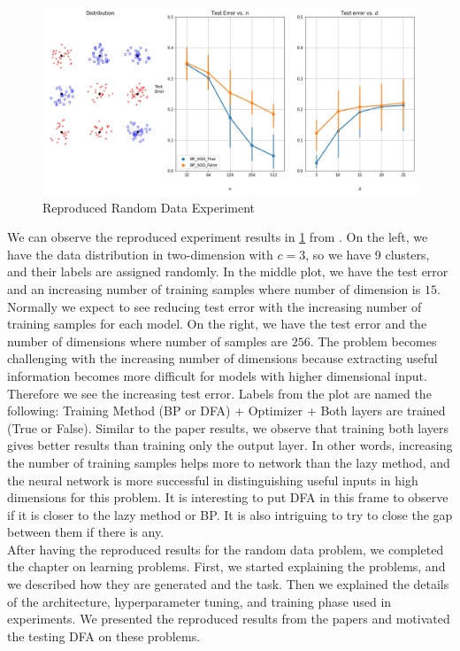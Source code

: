 \documentclass[a4paper, nobind]{templates/ociamthesis}
\begin{document}
\begin{figure}

{\centering \includegraphics[width=1\linewidth]{figures/2_randomData_reproduced} 

}

\caption{Reproduced Random Data Experiment \cite{chizat2020implicit}}\label{fig:randomData}
\end{figure}

\noindent We can observe the reproduced experiment results in \ref{fig:randomData} from \cite{chizat2020implicit}. On the left, we have the data distribution in two-dimension with \(c=3\), so we have 9 clusters, and their labels are assigned randomly. In the middle plot, we have the test error and an increasing number of training samples where number of dimension is \(15\). Normally we expect to see reducing test error with the increasing number of training samples for each model. On the right, we have the test error and the number of dimensions where number of samples are \(256\). The problem becomes challenging with the increasing number of dimensions because extracting useful information becomes more difficult for models with higher dimensional input. Therefore we see the increasing test error. Labels from the plot are named the following: Training Method (BP or DFA) + Optimizer + Both layers are trained (True or False). Similar to the paper results, we observe that training both layers gives better results than training only the output layer. In other words, increasing the number of training samples helps more to network than the lazy method, and the neural network is more successful in distinguishing useful inputs in high dimensions for this problem. It is interesting to put DFA in this frame to observe if it is closer to the lazy method or BP. It is also intriguing to try to close the gap between them if there is any.\\
After having the reproduced results for the random data problem, we completed the chapter on learning problems. First, we started explaining the problems, and we described how they are generated and the task. Then we explained the details of the architecture, hyperparameter tuning, and training phase used in experiments. We presented the reproduced results from the papers and motivated the testing DFA on these problems.
\end{document}
